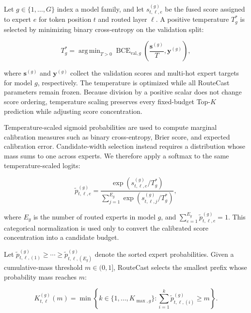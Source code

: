 \documentclass[conference]{IEEEtran}
\DeclareMathOperator*{\argmin}{arg\,min}
\begin{document}
Let \(g\in\{1,\ldots,G\}\) index a model family, and let
\(s_{t,\ell,e}^{(g)}\) be the fused score assigned to expert \(e\) for token
position \(t\) and routed layer \(\ell\). A positive temperature \(T_g^*\) is
selected by minimizing binary cross-entropy on the validation split:

\begin{equation}
T_g^*
=
\argmin_{T>0}
\operatorname{BCE}_{\mathrm{val},g}
\left(
\frac{\mathbf{s}^{(g)}}{T},
\mathbf{y}^{(g)}
\right),
\label{eq:temperature-selection}
\end{equation}

where \(\mathbf{s}^{(g)}\) and \(\mathbf{y}^{(g)}\) collect the validation
scores and multi-hot expert targets for model \(g\), respectively. The
temperature is optimized while all RouteCast parameters remain frozen.
Because division by a positive scalar does not change score ordering,
temperature scaling preserves every fixed-budget Top-\(K\) prediction while
adjusting score concentration.

Temperature-scaled sigmoid probabilities are used to compute marginal
calibration measures such as binary cross-entropy, Brier score, and expected
calibration error. Candidate-width selection instead requires a distribution
whose mass sums to one across experts. We therefore apply a softmax to the
same temperature-scaled logits:

\begin{equation}
\widetilde{p}_{t,\ell,e}^{(g)}
=
\frac{
\exp\!\left(s_{t,\ell,e}^{(g)}/T_g^*\right)
}{
\displaystyle
\sum_{j=1}^{E_g}
\exp\!\left(s_{t,\ell,j}^{(g)}/T_g^*\right)
},
\label{eq:calibrated-distribution}
\end{equation}

where \(E_g\) is the number of routed experts in model \(g\), and
\(\sum_{e=1}^{E_g}\widetilde{p}_{t,\ell,e}^{(g)}=1\).
This categorical normalization is used only to convert the calibrated score
concentration into a candidate budget.

Let
\(\widetilde{p}_{t,\ell,(1)}^{(g)}
\geq\cdots\geq
\widetilde{p}_{t,\ell,(E_g)}^{(g)}\)
denote the sorted expert probabilities. Given a cumulative-mass threshold
\(m\in(0,1]\), RouteCast selects the smallest prefix whose probability mass
reaches \(m\):

\begin{equation}
K_{t,\ell}^{(g)}(m)
=
\min
\left\{
k\in\{1,\ldots,K_{\max,g}\}:
\sum_{i=1}^{k}
\widetilde{p}_{t,\ell,(i)}^{(g)}
\geq m
\right\}.
\label{eq:adaptive-width}
\end{equation}
\end{document}
